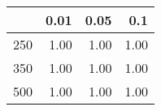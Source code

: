 % 
\begin{tabular}{rrrr}
  \hline
 & 0.01 & 0.05 & 0.1 \\ 
  \hline
250 & 1.00 & 1.00 & 1.00 \\ 
  350 & 1.00 & 1.00 & 1.00 \\ 
  500 & 1.00 & 1.00 & 1.00 \\ 
   \hline
\end{tabular}
